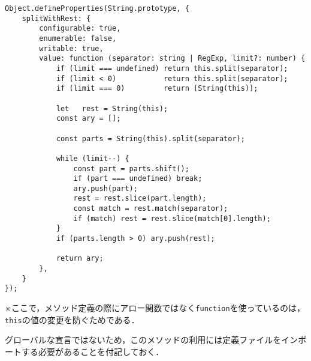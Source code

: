 \documentclass[autodetect-engine,dvi=dvipdfmx,ja=standard,
               a4j,11pt]{bxjsarticle}
\begin{document}
\begin{Verbatim}[numbers=none, xleftmargin=8mm, numbersep=6pt, fontsize=\small, baselinestretch=0.8]
Object.defineProperties(String.prototype, {
    splitWithRest: {
        configurable: true,
        enumerable: false,
        writable: true,
        value: function (separator: string | RegExp, limit?: number) {
            if (limit === undefined) return this.split(separator);
            if (limit < 0)           return this.split(separator);
            if (limit === 0)         return [String(this)];

            let   rest = String(this);
            const ary = [];

            const parts = String(this).split(separator);

            while (limit--) {
                const part = parts.shift();
                if (part === undefined) break;
                ary.push(part);
                rest = rest.slice(part.length);
                const match = rest.match(separator);
                if (match) rest = rest.slice(match[0].length);
            }
            if (parts.length > 0) ary.push(rest);

            return ary;
        },
    }
});
\end{Verbatim}
%
※ここで，メソッド定義の際にアロー関数ではなく\verb|function|を使っているのは，\verb|this|の値の変更を防ぐためである．

グローバルな宣言ではないため，このメソッドの利用には定義ファイルをインポートする必要があることを付記しておく．
\end{document}
